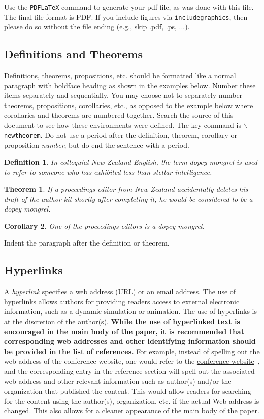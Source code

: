 \documentclass{wscpaperproc}
\theoremstyle{wsc}
\newtheorem{theorem}{Theorem}
\newtheorem{corollary}[theorem]{Corollary}
\newtheorem{definition}{Definition}
\begin{document}
Use the {\tt PDFLaTeX} command to generate your pdf file, as was done with this file. 
The final file format is PDF.
If you include figures via {\tt includegraphics}, then please do so without the file ending (e.g., skip .pdf, .ps, ...).

\subsection{Definitions and Theorems}
Definitions, theorems, propositions, etc. should be formatted like a normal paragraph with boldface heading as shown in the examples below. Number
these items separately and sequentially. You may choose not to separately number theorems, propositions, corollaries, etc., as opposed to the example below where corollaries and theorems are numbered together. Search the source of this document to see how these environments were defined. The key
command is {\tt $\backslash$newtheorem}. Do not use a period after the definition, theorem, corollary or proposition \textit{number}, but do end the sentence with a period.

\begin{definition}
In colloquial New Zealand English, the term {\em dopey mongrel} is used to refer to someone who has exhibited less than stellar intelligence.
\end{definition}

\begin{theorem}
If a proceedings editor from New Zealand accidentally deletes his draft of the author kit shortly after completing it, he would be considered to be a dopey mongrel.
\end{theorem}

\begin{corollary}
One of the proceedings editors is a dopey mongrel.
\end{corollary}

Indent the paragraph after the definition or theorem.

\subsection{Hyperlinks}
\label{sec: hyper}
A {\em hyperlink} specifies a web address (URL) or an email address.
The use of hyperlinks allows authors for providing readers access to external electronic information, such as a dynamic simulation or animation.
The use of hyperlinks is at the discretion of the author(s).
{\bf While the use of hyperlinked text is encouraged in the main body of the paper, it is recommended that corresponding web addresses and other identifying information should be provided in the list of references.}
For example, instead of spelling out the web address of the conference website, one would refer to the \href{http://www.wintersim.org}{conference website}~\cite{WSC}, and the corresponding entry in the reference section will spell out the associated web address and other relevant information such as author(s) and/or the organization that published the content.
This would allow readers for searching for the content using the author(s), organization, etc. if the actual Web address is changed. This also allows for a cleaner appearance of the main body of the paper.
\end{document}
